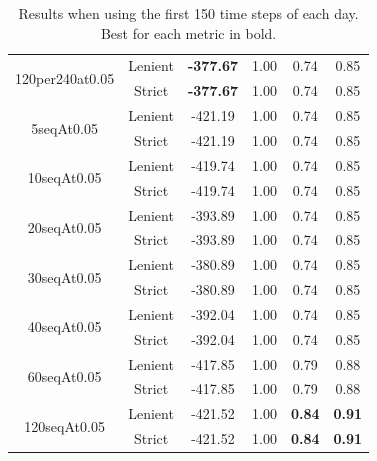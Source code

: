 \documentclass[12pt]{article}
\begin{document}
\begin{table}[]
\begin{tabular}{|cc|cccc|}
        \multirow{2}{*}{120per240at0.05} & Lenient & \textbf{-377.67}     & 1.00      & 0.74          & 0.85          \\
                                         & Strict  & \textbf{-377.67}     & 1.00      & 0.74          & 0.85          \\ \hline
        \multirow{2}{*}{5seqAt0.05}      & Lenient & -421.19              & 1.00      & 0.74          & 0.85          \\
                                         & Strict  & -421.19              & 1.00      & 0.74          & 0.85          \\ \hline
        \multirow{2}{*}{10seqAt0.05}     & Lenient & -419.74              & 1.00      & 0.74          & 0.85          \\
                                         & Strict  & -419.74              & 1.00      & 0.74          & 0.85          \\ \hline
        \multirow{2}{*}{20seqAt0.05}     & Lenient & -393.89              & 1.00      & 0.74          & 0.85          \\
                                         & Strict  & -393.89              & 1.00      & 0.74          & 0.85          \\ \hline
        \multirow{2}{*}{30seqAt0.05}     & Lenient & -380.89              & 1.00      & 0.74          & 0.85          \\
                                         & Strict  & -380.89              & 1.00      & 0.74          & 0.85          \\ \hline
        \multirow{2}{*}{40seqAt0.05}     & Lenient & -392.04              & 1.00      & 0.74          & 0.85          \\
                                         & Strict  & -392.04              & 1.00      & 0.74          & 0.85          \\ \hline
        \multirow{2}{*}{60seqAt0.05}     & Lenient & -417.85              & 1.00      & 0.79          & 0.88          \\
                                         & Strict  & -417.85              & 1.00      & 0.79          & 0.88          \\ \hline
        \multirow{2}{*}{120seqAt0.05}    & Lenient & -421.52              & 1.00      & \textbf{0.84} & \textbf{0.91} \\
                                         & Strict  & -421.52              & 1.00      & \textbf{0.84} & \textbf{0.91} \\ \hline
    \end{tabular}
    \caption{Results when using the first 150 time steps of each day. Best for each metric in bold.}
\end{table}
\end{document}
